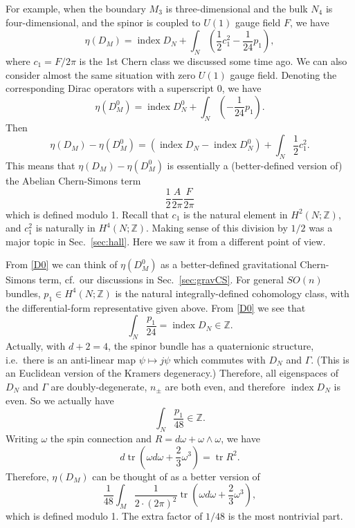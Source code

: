 \documentclass[12pt]{article}
\numberwithin{equation}{section}
\numberwithin{figure}{section}
\theoremstyle{remark}
\def\bZ{\mathbb{Z}}
\def\index{\mathop{\mathrm{index}}}
\def\tr{\mathop{\mathrm{tr}}\nolimits}
\begin{document}
For example, when the boundary $M_3$ is three-dimensional and the bulk $N_4$ is four-dimensional,
and the spinor is coupled to $U(1)$ gauge field $F$, we have \begin{equation}
\eta(D_M)=\index D_N + \int_N (\frac12 c_1^2-\frac1{24}p_1),
\end{equation} where $c_1=F/2\pi$ is the 1st Chern class we discussed some time ago.
We can also consider almost the same situation with zero $U(1)$ gauge field. 
Denoting the corresponding Dirac operators with a superscript $0$, we have \begin{equation}
\eta(D_M^0)=\index D_N^0 + \int_N (-\frac1{24}p_1).\label{D0}
\end{equation} Then \begin{equation}
\eta(D_M)-\eta(D_M^0)=(\index D_N-\index D_N^0) + \int_N \frac12 c_1^2.
\end{equation} This means that $\eta(D_M)-\eta(D_M^0)$ is essentially a (better-defined version of)
the Abelian Chern-Simons term
\begin{equation}
\frac12 \frac{A}{2\pi} \frac{F}{2\pi}
\end{equation}
which is defined modulo 1. 
Recall that $c_1$ is the natural element in $H^2(N;\bZ)$,
and $c_1^2$ is naturally in $H^4(N;\bZ)$.
Making sense of this division by $1/2$ was a major topic in Sec.~\ref{sec:hall}.
Here we saw it from a different point of view.

From \eqref{D0} we can think of $\eta(D_M^0)$ as a better-defined gravitational Chern-Simons term,
cf.~our discussions in Sec.~\ref{sec:gravCS}.
For general $SO(n)$  bundles, $p_1\in H^4(N;\bZ)$ is the natural integrally-defined cohomology class,
with the differential-form representative given above.
From \eqref{D0} we see that \begin{equation}
\int_N \frac{p_1}{24}=\index D_N \in \bZ.
\end{equation} Actually, with $d+2=4$, the spinor bundle has a quaternionic structure,
i.e.~there is an anti-linear map $\psi \mapsto j\psi$ which commutes with $D_N$ and $\Gamma$.
(This is an Euclidean version of the Kramers degeneracy.)
Therefore, all eigenspaces of $D_N$ and $\Gamma$ are doubly-degenerate,
$n_\pm$ are both even, and therefore $\index D_N$ is even. So we actually have \begin{equation}
\int_N \frac{p_1}{48} \in \bZ.
\end{equation}
Writing $\omega$ the spin connection and $R=d\omega+\omega\wedge \omega$,
we have \begin{equation}
d\tr \left( \omega d\omega +  \frac23 \omega^3\right) = \tr R^2.
\end{equation}
Therefore, $\eta(D_M)$ can be thought of as a better version of \begin{equation}
\frac{1}{48}\int_M \frac{1}{2\cdot (2\pi)^2}\tr \left(\omega d\omega +\frac23\omega^3\right),
\end{equation}
which is defined modulo 1. 
The extra factor of $1/48$ is the most nontrivial part.
\end{document}
